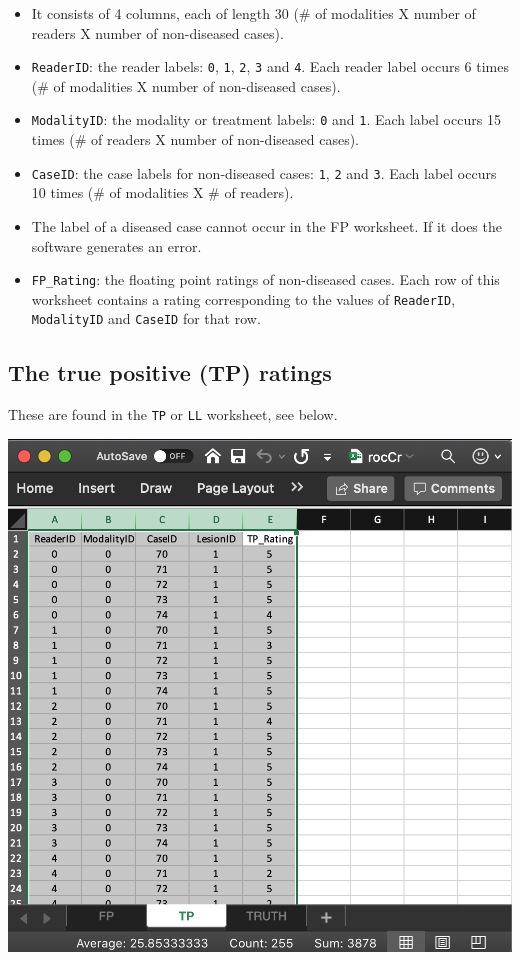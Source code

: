 \documentclass[
]{book}
\providecommand{\tightlist}{%
  \setlength{\itemsep}{0pt}\setlength{\parskip}{0pt}}
\begin{document}
\begin{itemize}
\tightlist
\item
  It consists of 4 columns, each of length 30 (\# of modalities X number of readers X number of non-diseased cases).
\item
  \texttt{ReaderID}: the reader labels: \texttt{0}, \texttt{1}, \texttt{2}, \texttt{3} and \texttt{4}. Each reader label occurs 6 times (\# of modalities X number of non-diseased cases).
\item
  \texttt{ModalityID}: the modality or treatment labels: \texttt{0} and \texttt{1}. Each label occurs 15 times (\# of readers X number of non-diseased cases).
\item
  \texttt{CaseID}: the case labels for non-diseased cases: \texttt{1}, \texttt{2} and \texttt{3}. Each label occurs 10 times (\# of modalities X \# of readers).
\item
  The label of a diseased case cannot occur in the FP worksheet. If it does the software generates an error.
\item
  \texttt{FP\_Rating}: the floating point ratings of non-diseased cases. Each row of this worksheet contains a rating corresponding to the values of \texttt{ReaderID}, \texttt{ModalityID} and \texttt{CaseID} for that row.
\end{itemize}

\hypertarget{quick-start-data-format-tp-worksheet}{%
\subsection{The true positive (TP) ratings}\label{quick-start-data-format-tp-worksheet}}

These are found in the \texttt{TP} or \texttt{LL} worksheet, see below.

\includegraphics[width=1\textwidth,height=\textheight]{images/quick-start/rocCrTp.png}
\end{document}
